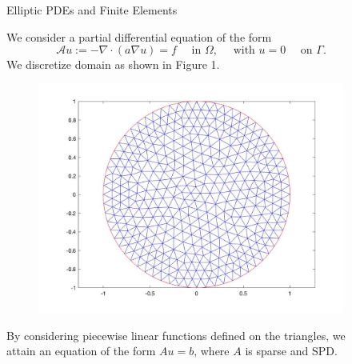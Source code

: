 \documentclass[final, 20pt]{beamer}
\newlength{\sepwid}
\newlength{\onecolwid}
\begin{document}
\begin{frame}[t]
\begin{columns}[t]
\begin{column}{\onecolwid}

\end{column}
\begin{column}{\sepwid}\end{column} 
\begin{column}{\onecolwid} 
\begin{block}{Elliptic PDEs and Finite Elements}
\begin{flushleft}
We consider a partial differential equation of the form
\[
\mathcal{A} u :=-\nabla \cdot(a \nabla u)=f \quad \text { in } \Omega, \quad \text { with } u=0 \quad \text { on } \Gamma.
\]
We discretize domain as shown in Figure 1.
\begin{figure}
	\centering
	\includegraphics[scale=0.8]{mesh}
\end{figure}

By considering piecewise linear functions defined on the triangles, we attain an equation of the form $Au=b$, where $A$ is sparse and SPD.
\end{flushleft}

\end{block}


\end{column}
\end{columns}
\end{frame}
\end{document}
